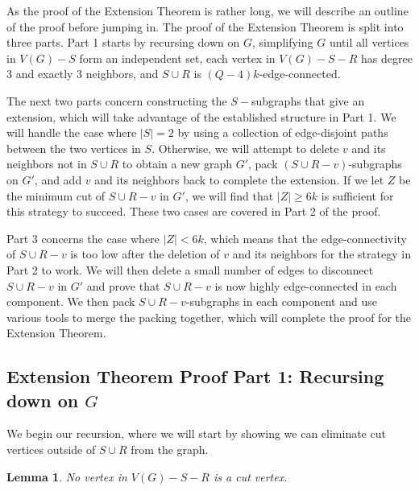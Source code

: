 \documentclass{article}
\newtheorem{lemma}{Lemma}[section]
\begin{document}
As the proof of the Extension Theorem is rather long, we will describe an outline of the proof before jumping in. The proof of the Extension Theorem is split into three parts. Part 1 starts by recursing down on $G$, simplifying $G$ until all vertices in $V(G)-S$ form an independent set, each vertex in $V(G)-S-R$ has degree 3 and exactly 3 neighbors, and $S \cup R$ is $(Q-4)k$-edge-connected. 

The next two parts concern constructing the $S-$subgraphs that give an extension, which will take advantage of the established structure in Part 1. We will handle the case where $|S|=2$ by using a collection of edge-disjoint paths between the two vertices in $S$. Otherwise, we will attempt to delete $v$ and its neighbors not in $S \cup R$ to obtain a new graph $G'$, pack $(S \cup R-v)$-subgraphs on $G'$, and add $v$ and its neighbors back to complete the extension. If we let $Z$ be the minimum cut of $S \cup R-v$ in $G'$, we will find that $|Z| \geq 6k$ is sufficient for this strategy to succeed. These two cases are covered in Part 2 of the proof.  

Part 3 concerns the case where $|Z| < 6k$, which means that the edge-connectivity of $S \cup R-v$ is too low after the deletion of $v$ and its neighbors for the strategy in Part 2 to work. We will then delete a small number of edges to disconnect $S \cup R-v$ in $G'$ and prove that $S \cup R-v$ is now highly edge-connected in each component. We then pack $S \cup R-v$-subgraphs in each component and use various tools to merge the packing together, which will complete the proof for the Extension Theorem. 

\subsection{Extension Theorem Proof Part 1: Recursing down on $G$}

We begin our recursion, where we will start by showing we can eliminate cut vertices outside of $S \cup R$ from the graph. 

\begin{lemma}
    No vertex in $V(G)-S-R$ is a cut vertex. 
\end{lemma}
\end{document}
